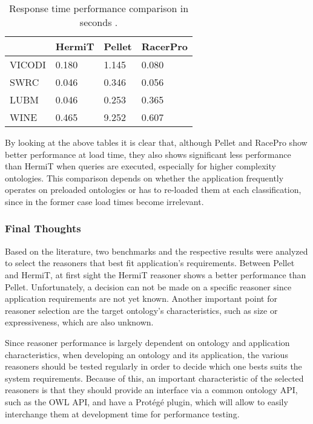 \begin{table}[]
\centering
\caption{Response time performance comparison in seconds \cite{Bock2008}.}
\begin{tabular}{|l|l|l|l|}
\hline
          &  HermiT  &  Pellet  & RacerPro \\ \hline
VICODI    &    0.180  &  1.145  & 0.080 \\ \hline
SWRC      &    0.046  &  0.346  & 0.056 \\ \hline
LUBM      &    0.046  &  0.253  & 0.365 \\ \hline
WINE      &    0.465  &  9.252  & 0.607 \\ \hline
\end{tabular}
\label{tab:4}
\end{table}

By looking at the above tables it is clear that, although Pellet and RacePro show better performance at load time, they also shows significant less performance than HermiT when queries are executed, especially for higher complexity ontologies. This comparison depends on whether the application frequently operates on preloaded ontologies or has to re-loaded them at each classification, since in the former case load times become irrelevant. 


\subsubsection{Final Thoughts}

Based on the literature, two benchmarks and the respective results were analyzed to select the reasoners that best fit application's requirements. Between Pellet and HermiT, at first sight the HermiT reasoner shows a better performance than Pellet.  Unfortunately, a decision can not be made on a specific reasoner since application requirements are not yet known. Another important point for reasoner selection are the target ontology's characteristics, such as size or expressiveness, which are also unknown. 

Since reasoner performance is largely dependent on ontology and application characteristics, when developing an ontology and its application, the various reasoners should be tested regularly in order to decide which one bests suits the system requirements. Because of this, an important characteristic of the selected reasoners is that they should provide an interface via a common ontology API, such as the OWL API, and have a Protégé plugin, which will allow to easily interchange them at development time for performance testing. 
